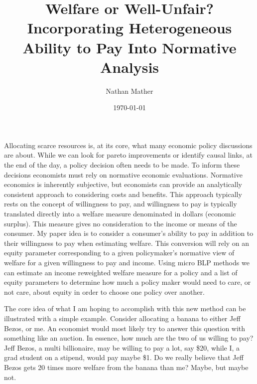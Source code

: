\documentclass[11pt]{article}
\title{Welfare or Well-Unfair? Incorporating Heterogeneous Ability to Pay Into Normative Analysis} %
\author{Nathan Mather} %
\date{\today} %
\begin{document}
	
	
\maketitle %

\setcounter{tocdepth}{3} %


\newpage


Allocating scarce resources is, at its core, what many economic policy discussions are about. While we can look for pareto improvements or identify causal links, at the end of the day, a policy decision often needs to be made. To inform these decisions economists must rely on normative economic evaluations. Normative economics is inherently subjective, but economists can provide an analytically consistent approach to considering costs and benefits. This approach typically rests on the concept of willingness to pay, and willingness to pay is typically translated directly into a welfare measure denominated in dollars (economic surplus). This measure gives no consideration to the income or means of the consumer. My paper idea is to consider a consumer's ability to pay in addition to their willingness to pay when estimating welfare. This conversion will rely on an equity parameter corresponding to a given policymaker's normative view of welfare for a given willingness to pay and income. Using micro BLP methods we can estimate an income reweighted welfare measure for a policy and a list of equity parameters to determine how much a policy maker would need to care, or not care, about equity in order to choose one policy over another.


The core idea of what I am hoping to accomplish with this new method can be illustrated with a simple example. Consider allocating a banana to either Jeff Bezos, or me. An economist would most likely try to answer this question with something like an auction. In essence, how much are the two of us willing to pay? Jeff Bezos, a multi billionaire, may be willing to pay a lot, say \$20, while I, a grad student on a stipend, would pay maybe \$1. Do we really believe that Jeff Bezos gets 20 times more welfare from the banana than me? Maybe, but maybe not. 
\end{document}
